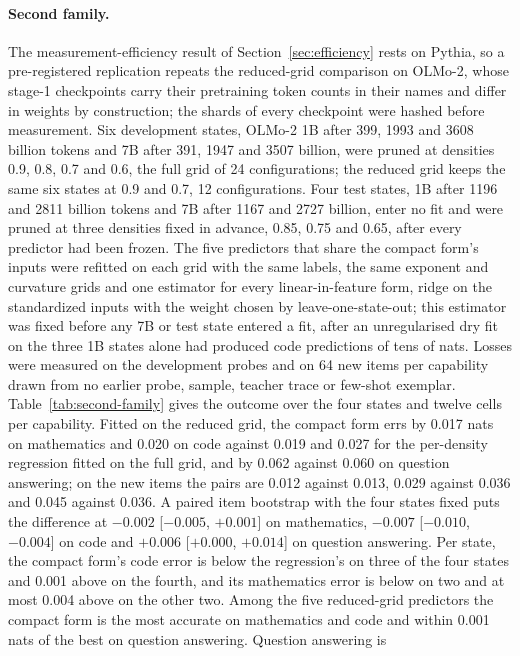 \paragraph{Second family.} The measurement-efficiency result of Section~\ref{sec:efficiency}
rests on Pythia, so a pre-registered replication repeats the reduced-grid comparison on OLMo-2, whose
stage-1 checkpoints carry their pretraining token counts in their names and differ in weights by
construction; the shards of every checkpoint were hashed before measurement. Six development states,
OLMo-2 1B after 399, 1993 and 3608 billion tokens and 7B after 391, 1947 and 3507 billion, were pruned
at densities 0.9, 0.8, 0.7 and 0.6, the full grid of 24 configurations; the reduced grid keeps the same
six states at 0.9 and 0.7, 12 configurations. Four test states, 1B after 1196 and 2811 billion tokens
and 7B after 1167 and 2727 billion, enter no fit and were pruned at three densities fixed in advance,
0.85, 0.75 and 0.65, after every predictor had been frozen. The five predictors that share the compact
form's inputs were refitted on each grid with the same labels, the same exponent and curvature grids
and one estimator for every linear-in-feature form, ridge on the standardized inputs with the weight
chosen by leave-one-state-out; this estimator was fixed before any 7B or test state entered a fit,
after an unregularised dry fit on the three 1B states alone had produced code predictions of tens of
nats. Losses were measured on the development probes and on 64 new items per capability drawn from no
earlier probe, sample, teacher trace or few-shot exemplar. Table~\ref{tab:second-family} gives the
outcome over the four states and twelve cells per capability. Fitted on the reduced grid, the compact
form errs by 0.017 nats on mathematics and 0.020 on code against 0.019 and 0.027 for the per-density
regression fitted on the full grid, and by 0.062 against 0.060 on question answering; on the new items
the pairs are 0.012 against 0.013, 0.029 against 0.036 and 0.045 against 0.036. A paired item
bootstrap with the four states fixed puts the difference at $-0.002$ [$-0.005$, $+0.001$] on
mathematics, $-0.007$ [$-0.010$, $-0.004$] on code and $+0.006$ [$+0.000$, $+0.014$] on question
answering. Per state, the compact form's code error is below the regression's on three of the four
states and 0.001 above on the fourth, and its mathematics error is below on two and at most 0.004
above on the other two. Among the five reduced-grid predictors the compact form is the most accurate
on mathematics and code and within 0.001 nats of the best on question answering. Question answering is

